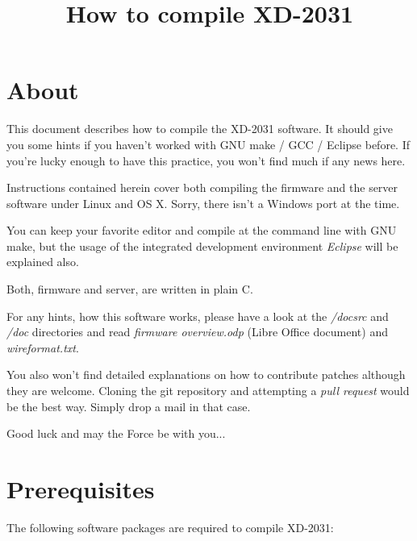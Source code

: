 




\newcommand{\screenshot}[2][scale=0.5]{ 
	\begin{center} 
	\includegraphics [ #1 ] {images/#2} 
	\end{center}  
}

\newcommand{\clickhere}[1]{\textit{#1}}
\newcommand{\typethis}[1]{\textbf{#1}}

\title{How to compile XD-2031}
\author{}
\maketitle
\clearpage

\tableofcontents
\clearpage

\section{About}
This document describes how to compile the XD-2031 software. 
It should give you some hints if you haven't worked with 
GNU make / GCC / Eclipse
before. If you're lucky enough to have this practice, you won't find
much if any news here.

Instructions contained herein cover both compiling the firmware and the
server software under Linux and OS X. Sorry, there isn't a Windows port 
at the time.

You can keep your favorite editor and compile at the command line with 
GNU make, but the usage of the integrated development environment 
\textit{Eclipse} will be explained also.

Both, firmware and server, are written in plain C.

For any hints, how this software works,
please have a look at the \textit{/docsrc} 
and \textit{/doc} directories and read \textit{firmware overview.odp} 
(Libre Office document) and \textit{wireformat.txt}.

You also won't find detailed explanations on how to contribute patches although
they are welcome. Cloning the git repository and attempting a 
\textit{pull request} would be the best way. Simply drop a mail in that case.

Good luck and may the Force be with you...

\section{Prerequisites}

The following software packages are required to compile XD-2031:

